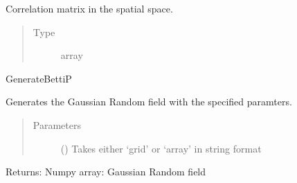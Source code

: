 \documentclass[letterpaper,10pt,english]{sphinxmanual}
\begin{document}
\begin{fulllineitems}
\begin{fulllineitems}
\begin{quote}
\begin{description}
\end{description}\end{quote}

\end{fulllineitems}


\begin{fulllineitems}
\label{\detokenize{gaussClass:gaussClass.GaussianRandomField.corr_f}}
\sphinxAtStartPar
Correlation matrix in the spatial space.
\begin{quote}\begin{description}
\item[{Type}] \leavevmode
\sphinxAtStartPar
array

\end{description}\end{quote}

\end{fulllineitems}


\begin{fulllineitems}
\label{\detokenize{gaussClass:gaussClass.GaussianRandomField.Gen_GRF}}
\sphinxAtStartPar
GenerateBettiP

\sphinxAtStartPar
Generates the Gaussian Random field with the specified paramters.
\begin{quote}\begin{description}
\item[{Parameters}] \leavevmode
\sphinxAtStartPar
{} () \textendash{} Takes either ‘grid’ or ‘array’ in string format

\end{description}\end{quote}

\sphinxAtStartPar
Returns:
Numpy array: Gaussian Random field

\end{fulllineitems}



\end{fulllineitems}
\end{document}
